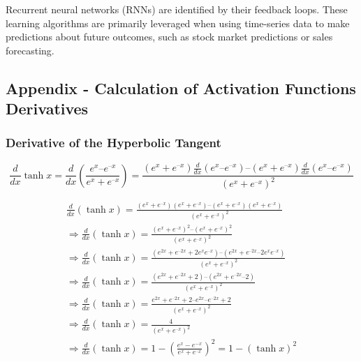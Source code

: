 \documentclass[11pt]{article}
\begin{document}
Recurrent neural networks (RNNs) are identified by their feedback loops.
These learning algorithms are primarily leveraged when using time-series
data to make predictions about future outcomes, such as stock market
predictions or sales forecasting.

    \hypertarget{appendix---calculation-of-activation-functions-derivatives}{%
\subsection{Appendix - Calculation of Activation Functions
Derivatives}\label{appendix---calculation-of-activation-functions-derivatives}}

\hypertarget{derivative-of-the-hyperbolic-tangent}{%
\subsubsection{Derivative of the Hyperbolic
Tangent}\label{derivative-of-the-hyperbolic-tangent}}

\[\frac{d}{{dx}}\tanh x = \frac{d}{{dx}}\left( {\frac{{{e^x} – {e^{ – x}}}}{{{e^x} + {e^{ – x}}}}} \right)
= \frac{{\left( {{e^x} + {e^{ – x}}} \right)\frac{d}{{dx}}\left( {{e^x} – {e^{ – x}}} \right) – \left( {{e^x} + {e^{ – x}}} \right)\frac{d}{{dx}}\left( {{e^x} – {e^{ – x}}} \right)}}{{{{\left( {{e^x} + {e^{ – x}}} \right)}^2}}}\]

\begin{equation}
\begin{gathered} \frac{d}{{dx}}\left( {\tanh x} \right) = \frac{{\left( {{e^x} + {e^{ – x}}} \right)\left( {{e^x} + {e^{ – x}}} \right) – \left( {{e^x} + {e^{ – x}}} \right)\left( {{e^x} + {e^{ – x}}} \right)}}{{{{\left( {{e^x} + {e^{ – x}}} \right)}^2}}} \\ \Rightarrow \frac{d}{{dx}}\left( {\tanh x} \right) = \frac{{{{\left( {{e^x} + {e^{ – x}}} \right)}^2} – {{\left( {{e^x} + {e^{ – x}}} \right)}^2}}}{{{{\left( {{e^x} + {e^{ – x}}} \right)}^2}}} \\ \Rightarrow \frac{d}{{dx}}\left( {\tanh x} \right) = \frac{{\left( {{e^{2x}} + {e^{ – 2x}} + 2{e^x}{e^{ – x}}} \right) – \left( {{e^{2x}} + {e^{ – 2x}} – 2{e^x}{e^{ – x}}} \right)}}{{{{\left( {{e^x} + {e^{ – x}}} \right)}^2}}} \\ \Rightarrow \frac{d}{{dx}}\left( {\tanh x} \right) = \frac{{\left( {{e^{2x}} + {e^{ – 2x}} + 2} \right) – \left( {{e^{2x}} + {e^{ – 2x}} – 2} \right)}}{{{{\left( {{e^x} + {e^{ – x}}} \right)}^2}}} \\ \Rightarrow \frac{d}{{dx}}\left( {\tanh x} \right) = \frac{{{e^{2x}} + {e^{ – 2x}} + 2 – {e^{2x}} – {e^{ – 2x}} + 2}}{{{{\left( {{e^x} + {e^{ – x}}} \right)}^2}}} \\ \Rightarrow \frac{d}{{dx}}\left( {\tanh x} \right) = \frac{4}{{{{\left( {{e^x} + {e^{ – x}}} \right)}^2}}} \\ \Rightarrow \frac{d}{{dx}}\left( {\tanh x} \right) = 1 - {\left( {\frac{e^x - e^{-x}}{{{e^x} + {e^{ – x}}}}} \right)^2} = 1 - {\left(\tanh x \right)}^2 \\ \end{gathered}
\end{equation}
\end{document}

